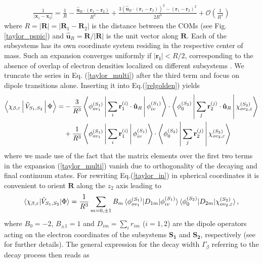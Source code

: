 \begin{align}\label{taylor_multi}
\frac{1}{\left| \mathbf{x}_1-\mathbf{x}_2 \right|} = \frac 1R - \frac{\mathbf{\hat{u}}_R \cdot (\mathbf{r}_1-\mathbf{r}_2)}{R^2}
+ \frac{3(\mathbf{\hat{u}}_R \cdot (\mathbf{r}_1-\mathbf{r}_2))^2 - (\mathbf{r}_1-\mathbf{r}_2)^2}{2R^3} + \mathcal{O} \left( \frac 1{R^4} \right)
\end{align}
where $R=|\mathbf{R}| = |\mathbf{R}_1-\mathbf{R}_2|$ is the distance between the COMs
(see Fig.\ref{taylor_pspic}) and $\mathbf{\hat{u}}_R =  \mathbf{R}/|\mathbf{R}|$ is
the unit vector along $\mathbf{R}$. Each of the subsystems has its own coordinate system
residing in the respective center of mass. Such an expansion converges uniformly
if $|\mathbf{r_i}|<R/2$, corresponding to the absence of overlap of electron
densities localized on different subsystems \cite{Ahlrichs76}. We truncate
the series in Eq. (\ref{taylor_multi}) after the third
term and focus on dipole transitions alone. Inserting it into Eq.(\ref{relgolden}) yields
\begin{align}\label{taylor_in}
\Braket{\chi_{\beta,\varepsilon}|\hat{V}_{S_1,S_2}|\Phi} 
          =&  -\frac{3}{R^3} \Braket{\phi_{ov_1}^{(S_1)}|\sum\limits_i \mathbf{r}_1^{(i)}\cdot\mathbf{\hat{u}}_R|\phi_{iv}^{(S_1)}}
           \cdot \Braket{\phi_{0}^{(S_2)}|\sum\limits_j \mathbf{r}_2^{(j)}\cdot\mathbf{\hat{u}}_R|\chi_{ov_2,\varepsilon}^{(S_2)}}
           \nonumber\\
          &+\frac{1}{R^3} \Braket{\phi_{ov_1}^{(S_1)}|\sum\limits_i \mathbf{r}_1^{(i)}|\phi_{iv}^{(S_1)}} \cdot
            \Braket{\phi_{0}^{(S_2)}|\sum\limits_j \mathbf{r}_2^{(j)}|\chi_{ov_2,\varepsilon}^{(S_2)}}
\end{align}
where we made use of the fact that the matrix elements over the first two terms
in the expansion (\ref{taylor_multi}) vanish due to orthogonality of the
decaying and final continuum states. For rewriting Eq.(\ref{taylor_in}) in
spherical coordinates it is convenient to orient $\mathbf{R}$ along the $z_2$ axis leading to
\begin{align}\label{last_matrixelement}
 \braket{\chi_{\beta,\varepsilon}|\hat{V}_{S_1,S_2}|\Phi} 
= \frac{1}{R^3} \sum\limits_{m=0,\pm 1} B_m \braket{\phi_{ov_1}^{(S_1)}|{D}_{1m}|\phi_{iv}^{(S_1)}}  \braket{\phi_{0}^{(S_2)}|{D}_{2m}|\chi_{ov_2,\varepsilon}^{(S_2)}} ,
\end{align}
where $B_0=-2$, $B_{\pm 1}=1$ and $D_{im} = \sum\limits_{i} r_{im}$ ($i=1,2$) are
the dipole operators acting on the electron coordinates of the
subsystems $\mathbf{S_1}$ and $\mathbf{S_2}$, respectively (see \cite{9} for
further details). The general expression for the decay width $\Gamma_\beta$
referring to the decay process then reads as

